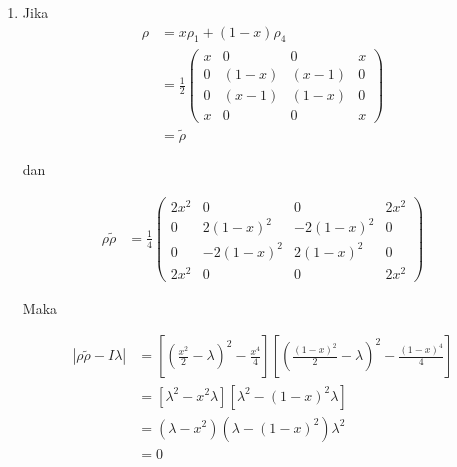 \begin{enumerate}
	\begin{equation}
		\begin{aligned}
			\lambda_{1,2}
			&=(\frac{1}{2}-x+x^2)\pm\frac{2}{2}\sqrt{(\frac{1}{2}-x+x^2)^2-(x^2-2x^3+x^4)}\\
			&=(\frac{1}{2}-x+x^2)\pm\frac{2}{2}\sqrt{(\frac{1}{4}+x^2+x^4-x+x^2-2x^3)-(x^2-2x^3+x^4)}\\
			&=(\frac{1}{2}-x+x^2)\pm\frac{1}{2}\sqrt{1-4x+4x^2}\\
			&=(\frac{1}{2}-x+x^2)\pm\frac{1}{2}\sqrt{(1-2x)^2}\\
			&=(\frac{1}{2}-x+x^2)\pm(\frac{1}{2}-x)\\
			&=x^2; 1-2x+x^2\\
			&=x^2; (1-x)^2
		\end{aligned}
	\end{equation}
	
	sehingga $\lambda_1=x$, $\lambda_2=(1-x)$, dan $\lambda_3=\lambda_4=0$.
	
	\item Jika
	\begin{equation}
		\begin{aligned}
			\rho
			&=x\rho_1+(1-x)\rho_4\\
			&=\frac{1}{2}
			\begin{pmatrix}
				x&0&0&x\\
				0&(1-x)&(x-1)&0\\
				0&(x-1)&(1-x)&0\\
				x&0&0&x
			\end{pmatrix}\\
			&=\tilde{\rho}
		\end{aligned}
	\end{equation}
	
	dan
	
	\begin{equation}
		\begin{aligned}
			\rho \tilde{\rho}
			&=\frac{1}{4}
			\begin{pmatrix}
				2x^2&0&0&2x^2\\
				0&2(1-x)^2&-2(1-x)^2&0\\
				0&-2(1-x)^2&2(1-x)^2&0\\
				2x^2&0&0&2x^2
			\end{pmatrix}
		\end{aligned}
	\end{equation}
	
	Maka
	
	\begin{equation}
		\begin{aligned}
			|\rho \tilde{\rho}-I\lambda|
			&=[(\frac{x^2}{2}-\lambda)^2-\frac{x^4}{4}][(\frac{(1-x)^2}{2}-\lambda)^2-\frac{(1-x)^4}{4}]\\
			&=[\lambda^2-x^2\lambda][\lambda^2-(1-x)^2\lambda]\\
			&=(\lambda-x^2)(\lambda-(1-x)^2)\lambda^2\\
			&=0
		\end{aligned}
	\end{equation}
	

\end{enumerate}
